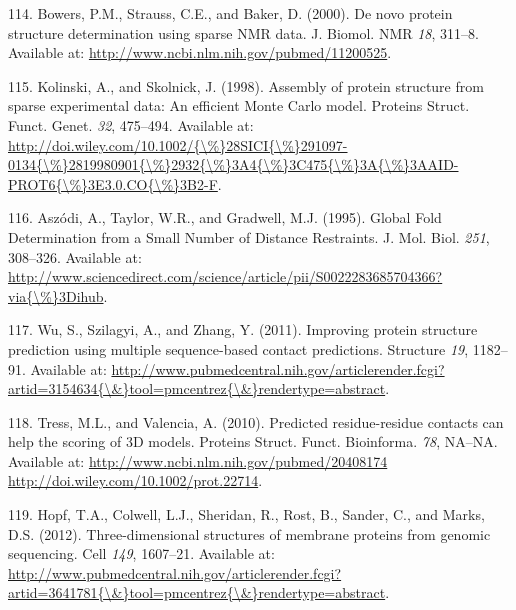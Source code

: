 \documentclass[11pt,a4paper,twoside]{book}
\theoremstyle{definition}
\theoremstyle{definition}
\theoremstyle{remark}
\begin{document}
\hypertarget{ref-Bowers2000}{}
114. Bowers, P.M., Strauss, C.E., and Baker, D. (2000). De novo protein
structure determination using sparse NMR data. J. Biomol. NMR \emph{18},
311--8. Available at: \url{http://www.ncbi.nlm.nih.gov/pubmed/11200525}.

\hypertarget{ref-Kolinski1998}{}
115. Kolinski, A., and Skolnick, J. (1998). Assembly of protein
structure from sparse experimental data: An efficient Monte Carlo model.
Proteins Struct. Funct. Genet. \emph{32}, 475--494. Available at:
\href{http://doi.wiley.com/10.1002/\%7B/\%\%7D28SICI\%7B/\%\%7D291097-0134\%7B/\%\%7D2819980901\%7B/\%\%7D2932\%7B/\%\%7D3A4\%7B/\%\%7D3C475\%7B/\%\%7D3A\%7B/\%\%7D3AAID-PROT6\%7B/\%\%7D3E3.0.CO\%7B/\%\%7D3B2-F}{http://doi.wiley.com/10.1002/\{\textbackslash{}\%\}28SICI\{\textbackslash{}\%\}291097-0134\{\textbackslash{}\%\}2819980901\{\textbackslash{}\%\}2932\{\textbackslash{}\%\}3A4\{\textbackslash{}\%\}3C475\{\textbackslash{}\%\}3A\{\textbackslash{}\%\}3AAID-PROT6\{\textbackslash{}\%\}3E3.0.CO\{\textbackslash{}\%\}3B2-F}.

\hypertarget{ref-Aszodi1995a}{}
116. Aszódi, A., Taylor, W.R., and Gradwell, M.J. (1995). Global Fold
Determination from a Small Number of Distance Restraints. J. Mol. Biol.
\emph{251}, 308--326. Available at:
\href{http://www.sciencedirect.com/science/article/pii/S0022283685704366?via\%7B/\%\%7D3Dihub}{http://www.sciencedirect.com/science/article/pii/S0022283685704366?via\{\textbackslash{}\%\}3Dihub}.

\hypertarget{ref-Wu2011}{}
117. Wu, S., Szilagyi, A., and Zhang, Y. (2011). Improving protein
structure prediction using multiple sequence-based contact predictions.
Structure \emph{19}, 1182--91. Available at:
\href{http://www.pubmedcentral.nih.gov/articlerender.fcgi?artid=3154634\%7B/\&\%7Dtool=pmcentrez\%7B/\&\%7Drendertype=abstract}{http://www.pubmedcentral.nih.gov/articlerender.fcgi?artid=3154634\{\textbackslash{}\&\}tool=pmcentrez\{\textbackslash{}\&\}rendertype=abstract}.

\hypertarget{ref-Tress2010}{}
118. Tress, M.L., and Valencia, A. (2010). Predicted residue-residue
contacts can help the scoring of 3D models. Proteins Struct. Funct.
Bioinforma. \emph{78}, NA--NA. Available at:
\href{http://www.ncbi.nlm.nih.gov/pubmed/20408174\%20http://doi.wiley.com/10.1002/prot.22714}{http://www.ncbi.nlm.nih.gov/pubmed/20408174 http://doi.wiley.com/10.1002/prot.22714}.

\hypertarget{ref-Hopf2012}{}
119. Hopf, T.A., Colwell, L.J., Sheridan, R., Rost, B., Sander, C., and
Marks, D.S. (2012). Three-dimensional structures of membrane proteins
from genomic sequencing. Cell \emph{149}, 1607--21. Available at:
\href{http://www.pubmedcentral.nih.gov/articlerender.fcgi?artid=3641781\%7B/\&\%7Dtool=pmcentrez\%7B/\&\%7Drendertype=abstract}{http://www.pubmedcentral.nih.gov/articlerender.fcgi?artid=3641781\{\textbackslash{}\&\}tool=pmcentrez\{\textbackslash{}\&\}rendertype=abstract}.
\end{document}
